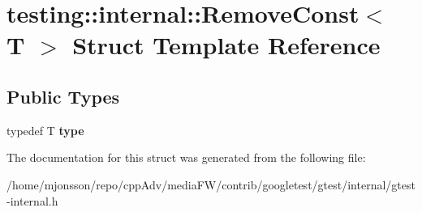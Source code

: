 \hypertarget{structtesting_1_1internal_1_1RemoveConst}{}\section{testing\+:\+:internal\+:\+:Remove\+Const$<$ T $>$ Struct Template Reference}
\label{structtesting_1_1internal_1_1RemoveConst}
\subsection*{Public Types}
\begin{DoxyCompactItemize}
\item 
\mbox{\label{structtesting_1_1internal_1_1RemoveConst_a1be32027ea4edcc0d15abd59aba4a97f}} 
typedef T {\bfseries type}
\end{DoxyCompactItemize}


The documentation for this struct was generated from the following file\+:\begin{DoxyCompactItemize}
\item 
/home/mjonsson/repo/cpp\+Adv/media\+F\+W/contrib/googletest/gtest/internal/gtest-\/internal.\+h\end{DoxyCompactItemize}
